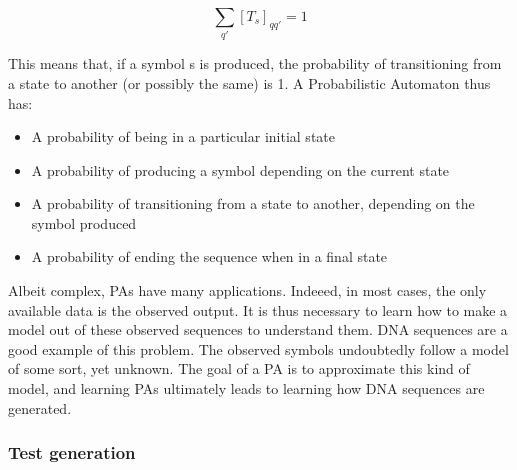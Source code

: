 \[
\sum_{q'}[T_{s}]_{qq'}=1
\]


This means that, if a symbol s is produced, the probability of transitioning
from a state to another (or possibly the same) is 1. A Probabilistic
Automaton thus has:
\begin{itemize}
\item A probability of being in a particular initial state
\item A probability of producing a symbol depending on the current state
\item A probability of transitioning from a state to another, depending
on the symbol produced
\item A probability of ending the sequence when in a final state
\end{itemize}
Albeit complex, PAs have many applications. Indeeed, in most cases,
the only available data is the observed output. It is thus necessary
to learn how to make a model out of these observed sequences to understand
them. DNA sequences are a good example of this problem. The observed
symbols undoubtedly follow a model of some sort, yet unknown. The
goal of a PA is to approximate this kind of model, and learning PAs
ultimately leads to learning how DNA sequences are generated.


\subsubsection{Test generation}

